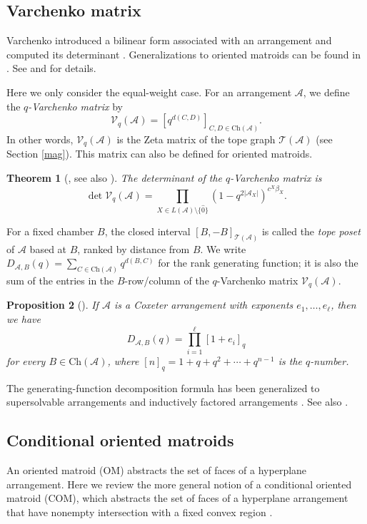 \documentclass{amsart}
\numberwithin{equation}{section}
\newtheorem{thm}{Theorem}[section]
\newtheorem{prop}[thm]{Proposition}
\theoremstyle{plain}
\theoremstyle{remark}
\theoremstyle{definition}
\numberwithin{equation}{section}
\newcommand{\A}{\mathcal{A}}
\newcommand{\T}{\mathcal{T}}
\newcommand{\Ch}{\mathrm{Ch}}
\begin{document}
\subsection{Varchenko matrix}


Varchenko introduced a bilinear form associated with an arrangement and computed its determinant \cite{Varchenko1993}. Generalizations to oriented matroids can be found in \cite{Hochstattler2019}. See \cite{Denham1999} and \cite[Sections 8.4--8.5]{Aguiar2017} for details. 

Here we only consider the equal-weight case. For an arrangement $\A$, we define the \emph{$q$-Varchenko matrix} by
\[
\mathcal{V}_q(\A)=[q^{d(C,D)}]_{C,D\in\Ch(\A)}.
\]
In other words, $\mathcal{V}_q(\A)$ is the Zeta matrix of the tope graph $\T(\A)$ (see Section \ref{mag}). This matrix can also be defined for oriented matroids.

\begin{thm}[\cite{Varchenko1993}, see also {\cite[Theorem 8.23]{Aguiar2017}}]\label{detvar}
    The determinant of the $q$-Varchenko matrix is
    \[
    \det\mathcal{V}_q(\A)=\prod_{X\in L(\A)\setminus\{\hat{0}\}}(1-q^{2|\A_X|})^{c^X\beta_X}.
    \]
\end{thm}

For a fixed chamber $B$, the closed interval $[B,-B]_{\T(\A)}$ is called the \emph{tope poset} of $\A$ based at $B$, ranked by distance from $B$.
We write $D_{\A,B}(q)=\sum_{C\in\Ch(\A)}q^{d(B,C)}$ for the rank generating function; it is also the sum of the entries in the $B$-row/column of the $q$-Varchenko matrix $\mathcal{V}_q(\A)$.

\begin{prop}[\cite{Solomon1966}]\label{Cox}
    If $\A$ is a Coxeter arrangement with exponents $e_1,\ldots,e_{\ell}$, then we have
    \[
    D_{\A,B}(q)=\prod_{i=1}^{\ell}[1+e_i]_q
    \]
    for every $B\in\Ch(\A)$, where $[n]_q=1+q+q^2+\cdots+q^{n-1}$ is the $q$-number.
\end{prop}


The generating-function decomposition formula has been generalized to supersolvable arrangements \cite{Bjorner1990} and inductively factored arrangements \cite{Jambu1995}. See also \cite{Abe2020,Oh2008,Giordani2025}.


\subsection{Conditional oriented matroids}
An oriented matroid (OM) abstracts the set of faces of a hyperplane arrangement. Here we review the more general notion of a conditional oriented matroid (COM), which abstracts the set of faces of a hyperplane arrangement that have nonempty intersection with a fixed convex region \cite{BCK-COM}.
\end{document}
